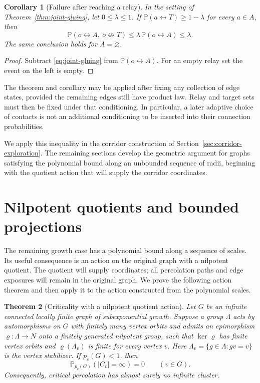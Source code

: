 \documentclass[11pt]{article}
\newtheorem{theorem}{Theorem}[section]
\newtheorem{corollary}[theorem]{Corollary}
\theoremstyle{definition}
\begin{document}
\begin{corollary}[Failure after reaching a relay]
\label{cor:gluing-failure}
In the setting of Theorem~\ref{thm:joint-gluing}, let $0\le\lambda\le1$.
If $\mathbb P(a\leftrightarrow T)\ge1-\lambda$ for every $a\in A$, then
\[
 \mathbb P(o\leftrightarrow A,\ o\not\leftrightarrow T)
 \le\lambda\,\mathbb P(o\leftrightarrow A)\le\lambda.
\]
The same conclusion holds for $A=\varnothing$.
\end{corollary}

\begin{proof}
Subtract \eqref{eq:joint-gluing} from $\mathbb P(o\leftrightarrow A)$.
For an empty relay set the event on the left is empty.
\end{proof}

The theorem and corollary may be applied after fixing any collection of
edge states, provided the remaining edges still have product law.
Relay and target sets must then be fixed under that conditioning.
In particular, a later adaptive choice of contacts is not an additional
conditioning to be inserted into their connection probabilities.

We apply this inequality in the corridor construction of
Section~\ref{sec:corridor-exploration}. The remaining sections develop
the geometric argument for graphs satisfying the polynomial bound along
an unbounded sequence of radii, beginning with the quotient action that
will supply the corridor coordinates.

\section{Nilpotent quotients and bounded projections}
\label{sec:structure}

The remaining growth case has a polynomial bound along a sequence of
scales. Its useful consequence is an action on the original graph with
a nilpotent quotient. The quotient will supply coordinates; all
percolation paths and edge exposures will remain in the original graph.
We prove the following action theorem and then apply it to the action
constructed from the polynomial scales.

\begin{theorem}[Criticality with a nilpotent quotient action]
\label{thm:structured}
Let $G$ be an infinite connected locally finite graph of subexponential
growth. Suppose a group $\Lambda$ acts by automorphisms on $G$ with
finitely many vertex orbits and admits an epimorphism $\varrho:\Lambda\to N$ onto a
finitely generated nilpotent group, such that $\ker\varrho$ has finite
vertex orbits and $\varrho(\Lambda_v)$ is finite for every vertex $v$.
Here $\Lambda_v=\{g\in\Lambda:gv=v\}$ is the vertex stabilizer.
If $p_c(G)<1$, then
\[
 \mathbb P_{p_c(G)}(|C_v|=\infty)=0\qquad(v\in G).
\]
Consequently, critical percolation has almost surely no infinite cluster.
\end{theorem}
\end{document}
